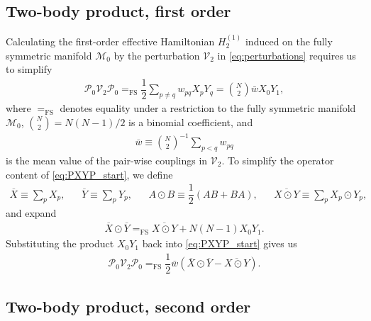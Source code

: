 \documentclass[nofootinbib,notitlepage,11pt]{revtex4-2}
\newcommand{\f}[2]{\dfrac{#1}{#2}} %
\newcommand{\p}[1]{\left(#1\right)} %
\newcommand{\1}{\mathds{1}}
\newcommand{\M}{\mathcal{M}}
\renewcommand{\P}{\mathcal{P}}
\newcommand{\V}{\mathcal{V}}
\newcommand{\EQFS}{=_{\text{FS}}}
\newcommand{\col}{\overline}
\begin{document}
\subsection{Two-body product, first order}
\label{sec:PXYP}

Calculating the first-order effective Hamiltonian $H_2^{(1)}$ induced
on the fully symmetric manifold $\M_0$ by the perturbation $\V_2$ in
\eqref{eq:perturbations} requires us to simplify
\begin{align}
  \P_0 \V_2 \P_0
  \EQFS \f12 \sum_{p\ne q} w_{pq} X_p Y_q
  = {N\choose 2} \bar w X_0 Y_1,
  \label{eq:PXYP_start}
\end{align}
where $\EQFS$ denotes equality under a restriction to the fully
symmetric manifold $\M_0$, ${N\choose2}=N\p{N-1}/2$ is a binomial
coefficient, and
\begin{align}
  \bar w \equiv {N\choose 2}^{-1} \sum_{p<q} w_{pq}
\end{align}
is the mean value of the pair-wise couplings in $\V_2$.  To simplify
the operator content of \eqref{eq:PXYP_start}, we define
\begin{align}
  \col{X} \equiv \sum_p X_p,
  &&
  \col{Y} \equiv \sum_p Y_p,
  &&
  A \odot B \equiv \f12\p{AB+BA},
  &&
  \col{X\odot Y} \equiv \sum_p X_p \odot Y_p,
\end{align}
and expand
\begin{align}
  \col{X}\odot\col{Y} \EQFS \col{X\odot Y} + N\p{N-1} X_0 Y_1.
\end{align}
Substituting the product $X_0 Y_1$ back into \eqref{eq:PXYP_start}
gives us
\begin{align}
  \P_0 \V_2 \P_0
  \EQFS \f12 \bar w \p{\col{X}\odot\col{Y} - \col{X\odot Y}}.
\end{align}

\subsection{Two-body product, second order}
\label{sec:PXYXYP}
\end{document}
